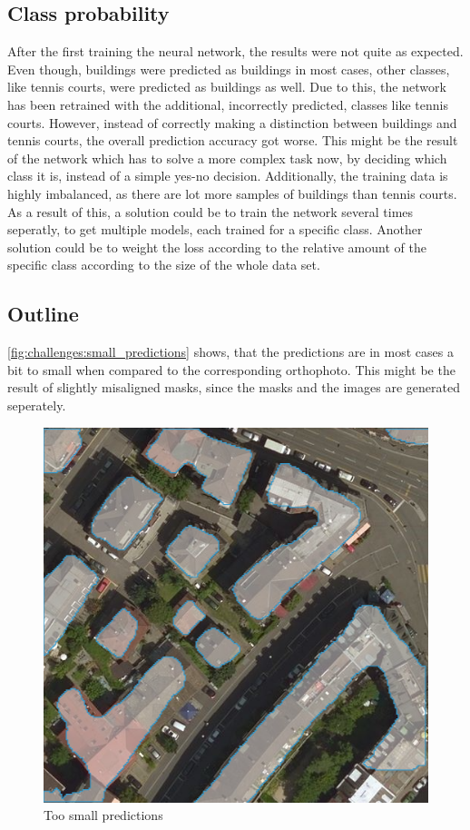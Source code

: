 \subsection{Class probability}
After the first training the neural network, the results were not quite as expected. Even though, buildings were predicted as buildings in most cases, other classes, like tennis courts, were predicted as buildings as well. Due to this, the network has been retrained with the additional, incorrectly predicted, classes like tennis courts. However, instead of correctly making a distinction between buildings and tennis courts, the overall prediction accuracy got worse. 
This might be the result of the network which has to solve a more complex task now, by deciding which class it is, instead of a simple yes-no decision. Additionally, the training data is highly imbalanced, as there are lot more samples of buildings than tennis courts.
As a result of this, a solution could be to train the network several times seperatly, to get multiple models, each trained for a specific class. Another solution could be to weight the loss according to the relative amount of the specific class according to the size of the whole data set.

\subsection{Outline}
\autoref{fig:challenges:small_predictions} shows, that the predictions are in most cases a bit to small when compared to the corresponding orthophoto. This might be the result of slightly misaligned masks, since the masks and the images are generated seperately.

\begin{figure}[H]
    \centering
	\includegraphics[width=0.6\linewidth]{chapters/challenges/images/small_predictions.png}
	\caption{Too small predictions}
	\label{fig:challenges:small_predictions}
\end{figure}


